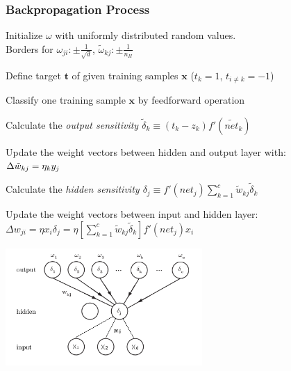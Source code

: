 \subsubsection{Backpropagation Process}
 \begin{minipage}{12cm}
 \begin{aufzaehlung}
   \item Initialize $\omega$ with uniformly distributed random values. \\
   Borders for $\omega_{ji}: \pm \frac{1}{\sqrt{d}}$, $\tilde \omega_{kj}: \pm \frac{1}{n_H}$
   \item Define target $\bm t$ of given training samples $\bm x $ ($t_k=1$, $t_{i \neq k} = -1$)
   \item Classify one training sample $\bm x$ by feedforward operation
   \item Calculate the \em output sensitivity \em $\tilde{\delta}_k \equiv (t_k - z_k) f'(\tilde{net}_k)$
   \item Update the weight vectors between hidden and output layer with:\\
   $ \Delta \tilde{w}_{kj} = \eta \title{\delta}_k y_j$
   \item Calculate the \em hidden sensitivity \em $\delta_j \equiv f'(net_j) \sum_{k=1}^c \tilde{w}_{kj}\tilde{\delta}_k$
   \item Update the weight vectors between input and hidden layer:\\
   $\Delta w_{ji}= \eta x_i \delta_j = \eta \left[ \sum\limits_{k=1}^c \tilde{w}_{kj} \tilde{\delta}_k \right] f'(net_j) x_i$
 \end{aufzaehlung}
 \end{minipage}
 \begin{minipage}{7.5cm}
 \includegraphics[width=7.5cm]{./images/backpropagation.png}
 \end{minipage}\\
 
